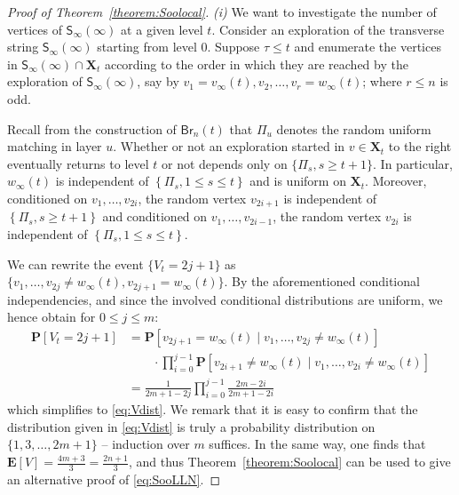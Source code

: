 \documentclass[a4paper,11pt,reqno]{amsart}
\newcommand{\paul}[1]{\todo[color=yellow!70,inline]{Paul: #1}}
\newcommand{\fabian}[1]{\todo[color=red!50,inline]{Fabian: #1}}
\newcommand{\bP}{\mathbf{P}}
\newcommand{\bE}{\mathbf{E}}
\newcommand{\Br}{\mathsf{Br}}
\newcommand{\Soo}{\mathsf{S}_\infty}
\theoremstyle{definition}
\begin{document}
\begin{proof}[Proof of Theorem~\ref{theorem:Soolocal}] \emph{(i)}
We want to investigate the number of vertices of $\Soo(\infty)$ at a given level $t$. Consider an exploration of the transverse string $\Soo(\infty)$ starting from level 0. Suppose $\tau\leq t$ and enumerate the vertices in $\Soo(\infty)\cap \mathbf{X}_t$ according to the order in which they are reached by the exploration of $\Soo(\infty)$, say by $v_1=v_\infty(t),v_2,\dots,v_r=w_\infty(t)$; where $r\leq n$ is odd. 
 
 Recall from the construction of $\Br_n(t)$ that $\Pi_u$ denotes the random uniform matching in layer $u$. Whether or not an exploration started in $v\in\mathbf{X}_t$ to the right eventually returns to level $t$ or not depends only on $\{\Pi_s, s \geq t+1\}$. In particular, $w_\infty(t)$ is independent of $\left\{\Pi_s, 1\leq s\leq t\right\}$ and is uniform on $\mathbf{X}_t$.
  Moreover, conditioned on $v_1,\dots,v_{2i}$, the random vertex $v_{2i+1}$ is independent of $\left\{\Pi_s, s \geq t+1\right\}$ and conditioned on $v_1,\dots,v_{2i-1}$, the random vertex $v_{2i}$ is independent of $\left\{\Pi_s, 1\leq s\leq t\right\}$. 
  
  We can rewrite the event $\{V_t=2j+1\}$ as $\{v_1,\dots,v_{2j}\neq w_{\infty}(t), v_{2j+1}=w_\infty(t)\}$. By the aforementioned conditional independencies, and since the involved conditional distributions are uniform, we hence obtain for $0\leq j\leq m$:
 \begin{align*}
  \bP[V_t=2j+1]
  &= \bP[v_{2j+1}=w_\infty(t)\mid v_1,\dots,v_{2j}\neq w_\infty(t)]\\
  &\qquad \cdot\prod_{i=0}^{j-1} \bP[v_{2i+1}\neq w_\infty(t)\mid v_1,\dots,v_{2i}\neq w_\infty(t)]\\
  &= \frac{1}{2m+1-2j} \prod_{i=0}^{j-1} \frac{2m-2i}{2m+1-2i}
 \end{align*}
 which simplifies to \eqref{eq:Vdist}. We remark that it is easy to confirm that the distribution given in \eqref{eq:Vdist} is truly a probability distribution on $\{1,3,\dots,2m+1\}$ -- induction over $m$ suffices. In the same way, one finds that $\bE[V]=\frac{4m+3}{3}=\frac{2n+1}{3}$, and thus Theorem~\ref{theorem:Soolocal} can be used to give an alternative proof of \eqref{eq:SooLLN}. 



\end{proof}
\end{document}
